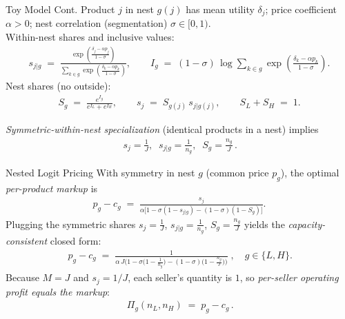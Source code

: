 \documentclass[10pt, xcolor=dvipsnames]{beamer}
\begin{document}
\begin{frame}{Toy Model Cont.}
    Product $j$ in nest $g(j)$ has mean utility $\delta_j$; price coefficient $\alpha>0$; nest correlation (segmentation) $\sigma\in[0,1)$. \\
    
    Within-nest shares and inclusive values:
        \begin{align*}
            s_{j|g} \;=\;
            \frac{\exp\!\left(\frac{\delta_j-\alpha p_j}{1-\sigma}\right)}
            {\sum_{k\in g}\exp\!\left(\frac{\delta_k-\alpha p_k}{1-\sigma}\right)},
            \qquad
            I_g \;=\; (1-\sigma)\,\log\!\sum_{k\in g}\exp\!\left(\frac{\delta_k-\alpha p_k}{1-\sigma}\right).
        \end{align*}
    Nest shares (no outside):
        \begin{align*}
            S_g \;=\;\frac{e^{I_g}}{e^{I_L}+e^{I_H}},
            \qquad
            s_j \;=\; S_{g(j)}\,s_{j|g(j)},
            \qquad
            S_L+S_H \;=\; 1.
        \end{align*}
    
    \emph{Symmetric-within-nest specialization} (identical products in a nest) implies
        \begin{align*}
            \boxed{\,s_j=\tfrac{1}{J},\;\; s_{j|g}=\tfrac{1}{n_g},\;\; S_g=\tfrac{n_g}{J}\,}.
        \end{align*}
    
\end{frame}

\begin{frame}{Nested Logit Pricing}
    With symmetry in nest $g$ (common price $p_g$), the optimal \emph{per-product markup} is
        \begin{align*}
            p_g - c_g \;=\; \frac{s_j}{\alpha\big[1 - \sigma(1-s_{j|g}) - (1-\sigma)(1-S_g)\big]}.
        \end{align*}
Plugging the symmetric shares $s_j=\tfrac{1}{J}$, $s_{j|g}=\tfrac{1}{n_g}$, $S_g=\tfrac{n_g}{J}$ yields the \emph{capacity-consistent} closed form:
\begin{align*}
\boxed{
\,p_g - c_g
\;=\;
\frac{1}{\alpha\,J\Big(1 - \sigma\!\big(1-\tfrac{1}{n_g}\big) - (1-\sigma)\!\big(1-\tfrac{n_g}{J}\big)\Big)}\;,\quad g\in\{L,H\}.
}
\end{align*}
Because $M=J$ and $s_j=1/J$, each seller’s quantity is $1$, so \emph{per-seller operating profit equals the markup}:
\begin{align*}
    \boxed{\,\Pi_g(n_L,n_H) \;=\; p_g - c_g\,}.
\end{align*}
    
\end{frame}
\end{document}
